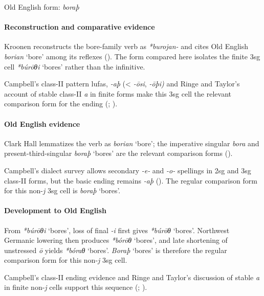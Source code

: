 \documentclass[
  british,
  a4paper,
]{article}
\providecommand{\Recon}[1]{\emph{*#1}}
\begin{document}
Old English form: \emph{boraþ}

\paragraph{Reconstruction and comparative
evidence}\label{reconstruction-and-comparative-evidence-137}

Kroonen reconstructs the bore-family verb as \emph{*burojan-} and cites
Old English {\emph{borian}} `bore' among its reflexes
(). The form compared here
isolates the finite 3sg cell \Recon{búrōθi} `bores' rather than the
infinitive.

Campbell's class-II pattern lufas, \emph{-aþ} (\textless{} \emph{-ōsi},
\emph{-ōþi)} and Ringe and Taylor's account of stable class-II \emph{a}
in finite forms make this 3sg cell the relevant comparison form for the
ending (;
).

\paragraph{Old English evidence}\label{old-english-evidence-137}

Clark Hall lemmatizes the verb as {\emph{borian}} `bore'; the imperative
singular \emph{bora} and present-third-singular {\emph{boraþ}} `bores'
are the relevant comparison forms ().

Campbell's dialect survey allows secondary \emph{-e-} and \emph{-o-}
spellings in 2sg and 3sg class-II forms, but the basic ending remains
\emph{-aþ} (). The
regular comparison form for this non-\emph{j} 3sg cell is {\emph{boraþ}}
`bores'.

\paragraph{Development to Old
English}\label{development-to-old-english-137}

From \Recon{búrōθi} `bores', loss of final \emph{-i} first gives
\Recon{búrōθ} `bores'. Northwest Germanic lowering then produces
\Recon{bórōθ} `bores', and late shortening of unstressed \emph{ō} yields
\Recon{bóraθ} `bores'. {\emph{Boraþ}} `bores' is therefore the regular
comparison form for this non-\emph{j} 3sg cell.

Campbell's class-II ending evidence and Ringe and Taylor's discussion of
stable \emph{a} in finite non-\emph{j} cells support this sequence
(;
).
\end{document}
